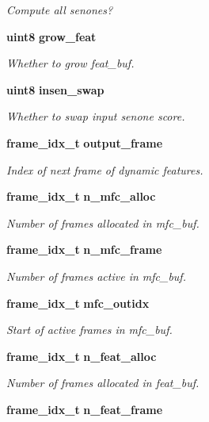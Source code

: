 \begin{DoxyCompactItemize}
\begin{DoxyCompactList}\small\item\em \-Compute all senones? \end{DoxyCompactList}\item 
{\bf uint8} {\bf grow\-\_\-feat}
\begin{DoxyCompactList}\small\item\em \-Whether to grow feat\-\_\-buf. \end{DoxyCompactList}\item 
{\bf uint8} {\bf insen\-\_\-swap}
\begin{DoxyCompactList}\small\item\em \-Whether to swap input senone score. \end{DoxyCompactList}\item 
{\bf frame\-\_\-idx\-\_\-t} {\bf output\-\_\-frame}
\begin{DoxyCompactList}\small\item\em \-Index of next frame of dynamic features. \end{DoxyCompactList}\item 
{\bf frame\-\_\-idx\-\_\-t} {\bf n\-\_\-mfc\-\_\-alloc}\label{structacmod__s_af4fa71ce8be75356a1f472959a9ff6d1}

\begin{DoxyCompactList}\small\item\em \-Number of frames allocated in mfc\-\_\-buf. \end{DoxyCompactList}\item 
{\bf frame\-\_\-idx\-\_\-t} {\bf n\-\_\-mfc\-\_\-frame}\label{structacmod__s_a1c5d63882997211e57ed698e33080958}

\begin{DoxyCompactList}\small\item\em \-Number of frames active in mfc\-\_\-buf. \end{DoxyCompactList}\item 
{\bf frame\-\_\-idx\-\_\-t} {\bf mfc\-\_\-outidx}\label{structacmod__s_afc6ef051f5de03c3f51aa740ff10a99b}

\begin{DoxyCompactList}\small\item\em \-Start of active frames in mfc\-\_\-buf. \end{DoxyCompactList}\item 
{\bf frame\-\_\-idx\-\_\-t} {\bf n\-\_\-feat\-\_\-alloc}\label{structacmod__s_a8269cb11354683ba83f1994b46e15466}

\begin{DoxyCompactList}\small\item\em \-Number of frames allocated in feat\-\_\-buf. \end{DoxyCompactList}\item 
{\bf frame\-\_\-idx\-\_\-t} {\bf n\-\_\-feat\-\_\-frame}\label{structacmod__s_a861cc097befe7e81473f0ae0972186e0}


\end{DoxyCompactItemize}
